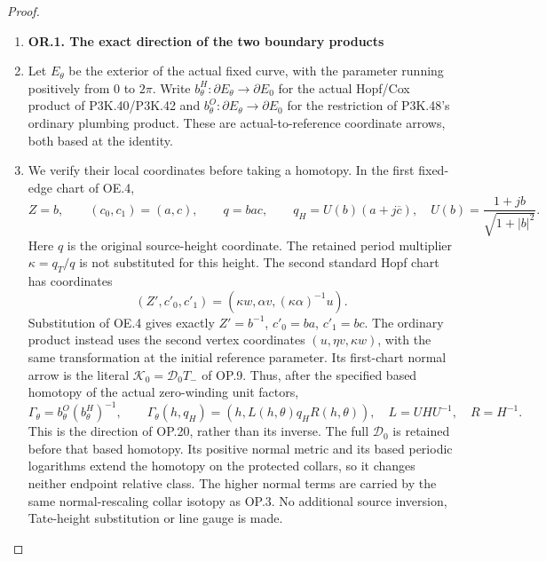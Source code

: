 \begin{proof}
\begin{enumerate}[label=\arabic*.]
\item \par

\medskip\noindent\textbf{OR.1. The exact direction of the two boundary products}

\par\nobreak

\item Let \(E_\theta\) be the exterior of the actual fixed curve, with the
parameter running positively from \(0\) to \(2\pi\). Write
\(b^H_\theta:\partial E_\theta\to\partial E_0\) for the actual
Hopf/Cox product of P3K.40/P3K.42 and
\(b^O_\theta:\partial E_\theta\to\partial E_0\) for the restriction
of P3K.48's ordinary plumbing product. These are actual-to-reference
coordinate arrows, both based at the identity.

\item We verify their local coordinates before taking a homotopy. In the
first fixed-edge chart of OE.4,
\[
 Z=b,\qquad(c_0,c_1)=(a,c),\qquad q=bac,\qquad
 q_H=U(b)(a+j\overline c),\quad
 U(b)=\frac{1+jb}{\sqrt{1+|b|^2}}.                 \tag{OR.1}
\]
Here \(q\) is the original source-height coordinate. The retained
period multiplier \(\kappa=q_T/q\) is not substituted for this
height. The second standard Hopf chart has coordinates
\[
 (Z',c'_0,c'_1)=(\kappa w,\alpha v,(\kappa\alpha)^{-1}u).
                                                               \tag{OR.2}
\]
Substitution of OE.4 gives exactly
\(Z'=b^{-1}\), \(c'_0=ba\), \(c'_1=bc\).
The ordinary product instead uses the second vertex coordinates
\((u,\eta v,\kappa w)\), with the same transformation at the
initial reference parameter. Its first-chart normal arrow is the
literal \(\mathcal K_0=\mathcal D_0 T_-\) of OP.9. Thus, after the
specified based homotopy of the actual zero-winding unit factors,
\[
 \Gamma_\theta=b^O_\theta(b^H_\theta)^{-1},\qquad
 \Gamma_\theta(h,q_H)=
       (h,L(h,\theta)q_H R(h,\theta)),
 \quad L=UHU^{-1},\quad R=H^{-1}.                     \tag{OR.3}
\]
This is the direction of OP.20, rather than its inverse. The full
\(\mathcal D_0\) is retained before that based homotopy. Its
positive normal metric and its based periodic logarithms extend the
homotopy on the protected collars, so it changes neither endpoint
relative class. The higher normal terms are carried by the same
normal-rescaling collar isotopy as OP.3. No additional source
inversion, Tate-height substitution or line gauge is made.


\end{enumerate}
\end{proof}
